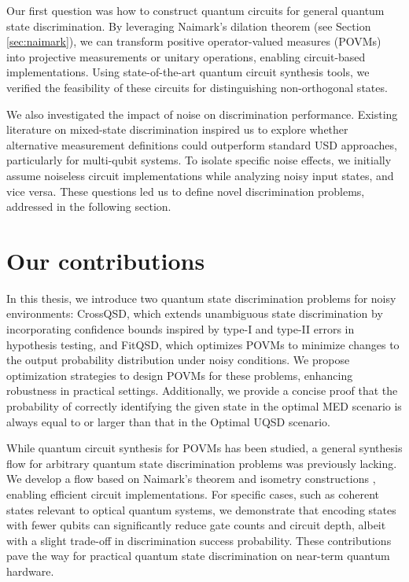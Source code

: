 Our first question was how to construct quantum circuits for general quantum
state discrimination.
By leveraging Naimark's dilation theorem (see Section \ref{sec:naimark}), we
can transform positive operator-valued measures (POVMs) into projective
measurements or unitary operations, enabling circuit-based implementations.
Using state-of-the-art quantum circuit synthesis tools, we verified the
feasibility of these circuits for distinguishing non-orthogonal states.

We also investigated the impact of noise on discrimination performance.
Existing literature on mixed-state discrimination inspired us to explore
whether alternative measurement definitions could outperform standard USD
approaches, particularly for multi-qubit systems.
To isolate specific noise effects, we initially assume noiseless circuit
implementations while analyzing noisy input states, and vice versa.
These questions led us to define novel discrimination problems, addressed in
the following section.

\section{Our contributions}
In this thesis, we introduce two quantum state discrimination problems for noisy environments:
CrossQSD, which extends unambiguous state discrimination by incorporating
confidence bounds inspired by type-I and type-II errors in hypothesis testing,
and FitQSD, which optimizes POVMs to minimize changes to the output
probability distribution under noisy conditions.
We propose optimization strategies to design POVMs for these problems,
enhancing robustness in practical settings.
Additionally, we provide a concise proof that the probability of correctly
identifying the given state in the optimal MED scenario is always equal to or
larger than that in the Optimal UQSD scenario.

While quantum circuit synthesis for POVMs has been studied, a general synthesis
flow for arbitrary quantum state discrimination problems was previously lacking.
We develop a flow based on Naimark's theorem and isometry constructions
\cite{RN12}, enabling efficient circuit implementations.
For specific cases, such as coherent states relevant to optical quantum systems,
we demonstrate that encoding states with fewer qubits can significantly reduce
gate counts and circuit depth, albeit with a slight trade-off in discrimination
success probability.
These contributions pave the way for practical quantum state discrimination on
near-term quantum hardware.

